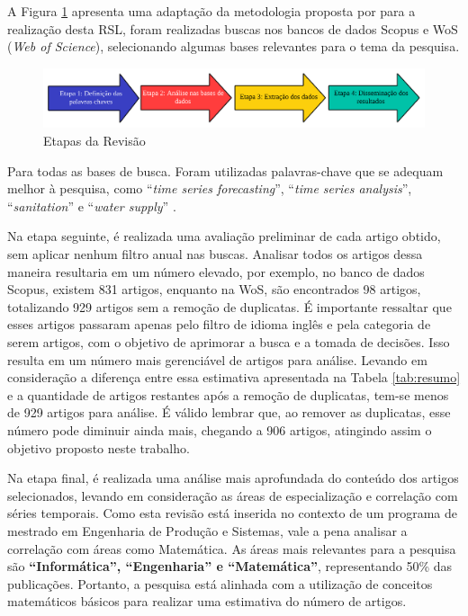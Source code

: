 A Figura \ref{fig:rsl} apresenta uma adaptação da metodologia proposta por  para a realização desta RSL, foram realizadas buscas nos bancos de dados Scopus e WoS (\textit{Web of Science}), selecionando algumas bases relevantes para o tema da pesquisa.

\begin{figure}[H]
	\centering
	\caption{Etapas da Revisão}
	\label{fig:rsl}
	\includegraphics[width=1\linewidth]{Revisao/Figuras/RSL}
	
\end{figure}

Para todas as bases de busca. Foram utilizadas palavras-chave que se adequam melhor à pesquisa, como ``\textit{time series forecasting}'', ``\textit{time series analysis}'', ``\textit{sanitation}'' e ``\textit{water supply}'' .


Na etapa seguinte, é realizada uma avaliação preliminar de cada artigo obtido, sem aplicar nenhum filtro anual nas buscas. Analisar todos os artigos dessa maneira resultaria em um número elevado, por exemplo, no banco de dados Scopus, existem 831 artigos, enquanto na WoS, são encontrados 98 artigos, totalizando 929 artigos sem a remoção de duplicatas. É importante ressaltar que esses artigos passaram apenas pelo filtro de idioma inglês e pela categoria de serem artigos, com o objetivo de aprimorar a busca e a tomada de decisões. Isso resulta em um número mais gerenciável de artigos para análise. Levando em consideração a diferença entre essa estimativa apresentada na Tabela \ref{tab:resumo} e a quantidade de artigos restantes após a remoção de duplicatas, tem-se menos de 929 artigos para análise. É válido lembrar que, ao remover as duplicatas, esse número pode diminuir ainda mais, chegando a 906 artigos, atingindo assim o objetivo proposto neste trabalho.

Na etapa final, é realizada uma análise mais aprofundada do conteúdo dos artigos selecionados, levando em consideração as áreas de especialização e correlação com séries temporais. Como esta revisão está inserida no contexto de um programa de mestrado em Engenharia de Produção e Sistemas, vale a pena analisar a correlação com áreas como Matemática. As áreas mais relevantes para a pesquisa são \textbf{``Informática'', ``Engenharia'' e ``Matemática''}, representando 50\% das publicações. Portanto, a pesquisa está alinhada com a utilização de conceitos matemáticos básicos para realizar uma estimativa do número de artigos.


